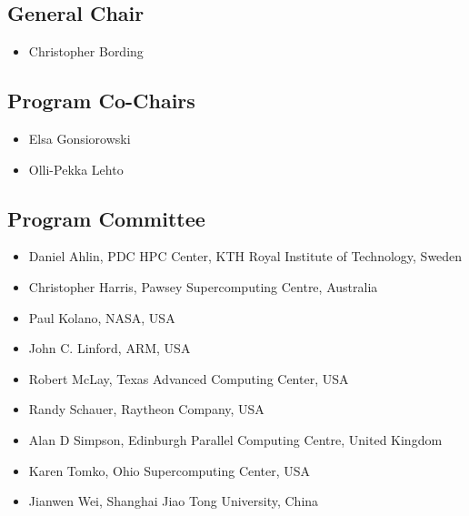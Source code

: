 \documentclass[11pt,a4paper]{article}
\begin{document}
\subsection{General Chair}
\begin{itemize}
\item Christopher Bording
\end{itemize}
\subsection{Program Co-Chairs}

\begin{itemize}
\item Elsa Gonsiorowski
\item Olli-Pekka Lehto
\end{itemize}

\subsection{Program Committee}

\begin{itemize}
\item Daniel Ahlin, PDC HPC Center, KTH Royal Institute of Technology, Sweden
\item Christopher Harris, Pawsey Supercomputing Centre, Australia
\item Paul Kolano, NASA, USA
\item John C. Linford, ARM, USA
\item Robert McLay, Texas Advanced Computing Center, USA
\item Randy Schauer, Raytheon Company, USA
\item Alan D Simpson, Edinburgh Parallel Computing Centre, United Kingdom
\item Karen Tomko, Ohio Supercomputing Center, USA
\item Jianwen Wei, Shanghai Jiao Tong University, China
\end{itemize}
\end{document}
